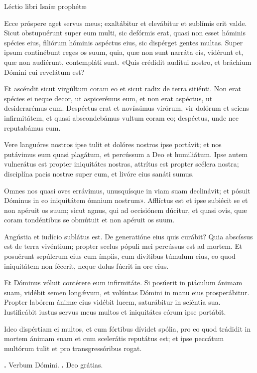 
Léctio libri Isaíæ prophétæ

Ecce próspere aget servus meus; exaltábitur et elevábitur et sublímis erit valde.
Sicut obstupuérunt super eum multi, sic defórmis erat, quasi non esset hóminis spécies eius, filiórum hóminis aspéctus eius, sic dispérget gentes multas.
Super ipsum continébunt reges os suum, quia, quæ non sunt narráta eis, vidérunt et, quæ non audiérunt, contempláti sunt.
«Quis crédidit audítui nostro, et bráchium Dómini cui revelátum est?

Et ascéndit sicut virgúltum coram eo et sicut radix de terra sitiénti.
Non erat spécies ei neque decor, ut aspicerémus eum, et non erat aspéctus, ut desiderarémus eum.
Despéctus erat et novíssimus virórum, vir dolórum et sciens infirmitátem, et quasi abscondebámus vultum coram eo; despéctus, unde nec reputabámus eum.

Vere languóres nostros ipse tulit et dolóres nostros ipse portávit; et nos putávimus eum quasi plagátum, et percússum a Deo et humiliátum.
Ipse autem vulnerátus est propter iniquitátes nostras, attrítus est propter scélera nostra; disciplína pacis nostræ super eum, et livóre eius sanáti sumus.

Omnes nos quasi oves errávimus, unusquísque in viam suam declinávit; et pósuit Dóminus in eo iniquitátem ómnium nostrum».
Afflíctus est et ipse subiécit se et non apéruit os suum; sicut agnus, qui ad occisiónem dúcitur, et quasi ovis, quæ coram tondéntibus se obmútuit et non apéruit os suum.

Angústia et iudício sublátus est. De generatióne eius quis curábit? Quia abscíssus est de terra vivéntium; propter scelus pópuli mei percússus est ad mortem. Et posuérunt sepúlcrum eius cum ímpiis, cum divítibus túmulum eius, eo quod iniquitátem non fécerit, neque dolus fúerit in ore eius.

Et Dóminus vóluit contérere eum infirmitáte. Si posúerit in piáculum ánimam suam, vidébit semen long\'{\ae}vum, et volúntas Dómini in manu eius prosperábitur.
Propter labórem ánimæ eius vidébit lucem, saturábitur in sciéntia sua.
Iustificábit iustus servus meus multos et iniquitátes eórum ipse portábit.

Ideo dispértiam ei multos, et cum fórtibus dívidet spólia, pro eo quod trádidit in mortem ánimam suam et cum scelerátis reputátus est; et ipse peccátum multórum tulit et pro transgressóribus rogat.

\textbf{\Vbar.} Verbum Dómini.
\textbf{\Rbar.} Deo grátias.
\par